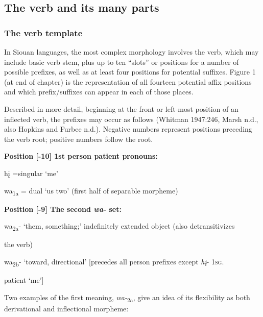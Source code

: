 \documentclass[output=paper]{LSP/langsci}
\begin{document}
\subsection{The verb and its many parts}
	
\subsubsection{The verb template}  									                      
In Siouan languages, the most complex morphology involves the verb, which may include basic verb stem, plus up to ten ``slots'' or positions for a number of possible prefixes, as well as at least four positions for potential suffixes.  Figure 1 (at end of chapter) is the representation of all fourteen potential affix positions and which prefix/suffixes can appear in each of those places. 

Described in more detail, beginning at the front or left-most position of an inflected verb, the prefixes may occur as follows (Whitman 1947:246, Marsh n.d., also Hopkins and Furbee n.d.). Negative numbers represent positions preceding the verb root; positive numbers follow the root.

\vspace{1em}
\textbf{Position [-10] 	1st person patient pronouns:} 	

\hspace{2em} h\k{i} =singular `me' 
												
\hspace{2em} wa\textsubscript{1a} = dual  `us two'	 (first half of separable morpheme)					           

\vspace{1em}
\textbf{Position [-9] 	The second \textit{wa-}  set:} 	
										
\hspace{2em} wa\textsubscript{2a}- `them, something;' indefinitely extended object (also detransitivizes 

\hspace{3em} the verb)		
	
\hspace{2em} wa\textsubscript{2b}- `toward, directional' 	[precedes all person prefixes except \textit{h\k{i}}- 1\textsc{sg}.

\hspace{3em} patient `me'] 	 				      

\vspace{1em}
Two examples of the first meaning, \textit{wa-}\textsubscript{2a}, give an idea of its flexibility as both derivational and inflectional morpheme:    	
\end{document}
